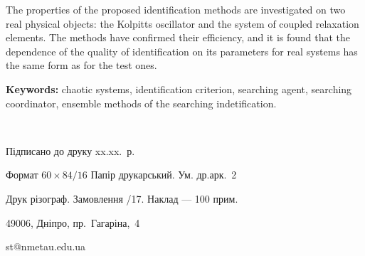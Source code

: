 \documentclass[a4paper,13pt]{atuaref}
\begin{document}
The properties of the proposed identification methods are investigated on two
real physical objects: the Kolpitts oscillator and the system of coupled
relaxation elements. The methods have confirmed their efficiency, and it is
found that the dependence of the quality of identification on its parameters
for real systems has the same form as for the test ones.


\textbf{Keywords:}
chaotic systems,
identification criterion,
searching agent,
searching coordinator,
ensemble methods of the searching indetification.

\clearpage

{~}
\vfill

\begin{center}


Підписано до друку xx.xx.\bookyear~р.

Формат $60 \times 84/16$  Папір друкарський. Ум. др.арк.~2

Друк різограф. Замовлення /17. Наклад --- 100 прим.


49006, Дніпро, пр.~Гагаріна,~4

st@nmetau.edu.ua

\end{center}

\vfill
\end{document}
